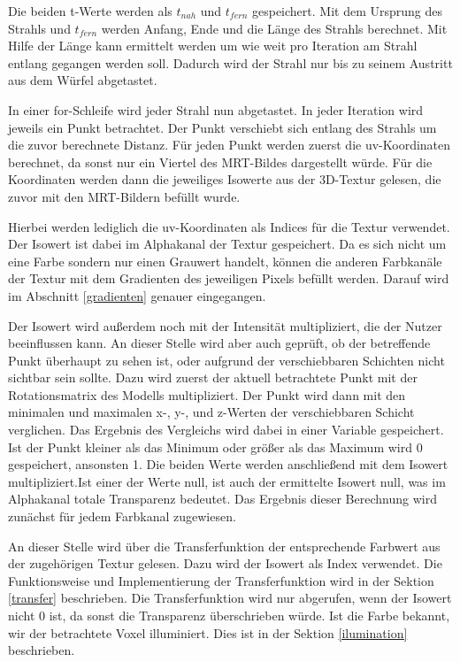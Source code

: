 Die beiden t-Werte werden als $t_{nah}$ und $t_{fern}$ gespeichert.
Mit dem Ursprung des Strahls und $t_{fern}$ werden Anfang, Ende und die Länge des Strahls berechnet. Mit Hilfe der Länge kann ermittelt werden um wie weit pro Iteration am Strahl entlang gegangen werden soll. Dadurch wird der Strahl nur bis zu seinem Austritt aus dem Würfel abgetastet. 

In einer for-Schleife wird jeder Strahl nun abgetastet. In jeder Iteration wird jeweils ein Punkt betrachtet. Der Punkt verschiebt sich entlang des Strahls um die zuvor berechnete Distanz.
Für jeden Punkt werden zuerst die uv-Koordinaten berechnet, da sonst nur ein Viertel des MRT-Bildes dargestellt würde.
Für die Koordinaten werden dann die jeweiliges Isowerte aus der 3D-Textur gelesen, die zuvor mit den MRT-Bildern befüllt wurde.

Hierbei werden lediglich die uv-Koordinaten als Indices für die Textur verwendet. 
Der Isowert ist dabei im Alphakanal der Textur gespeichert. Da es sich nicht um eine Farbe sondern nur einen Grauwert handelt, können die anderen Farbkanäle der Textur mit dem Gradienten des jeweiligen Pixels befüllt werden. Darauf wird im Abschnitt \ref{gradienten} genauer eingegangen.

Der Isowert wird außerdem noch mit der Intensität multipliziert, die der Nutzer beeinflussen kann.
An dieser Stelle wird aber auch geprüft, ob der betreffende Punkt überhaupt zu sehen ist, oder aufgrund der verschiebbaren Schichten nicht sichtbar sein sollte. 
Dazu wird zuerst der aktuell betrachtete Punkt mit der Rotationsmatrix des Modells multipliziert.
Der Punkt wird dann mit den minimalen und maximalen x-, y-, und z-Werten der verschiebbaren Schicht verglichen. Das Ergebnis des Vergleichs wird dabei in einer Variable gespeichert. Ist der Punkt kleiner als das Minimum oder größer als das Maximum wird 0 gespeichert, ansonsten 1. 
Die beiden Werte werden anschließend mit dem Isowert multipliziert.Ist einer der Werte null, ist auch der ermittelte Isowert null, was im Alphakanal totale Transparenz bedeutet. 
Das Ergebnis dieser Berechnung wird zunächst für jedem Farbkanal zugewiesen.

An dieser Stelle wird über die Transferfunktion der entsprechende Farbwert aus der zugehörigen Textur gelesen. Dazu wird der Isowert als Index verwendet. Die Funktionsweise und Implementierung der Transferfunktion wird in der Sektion \ref{transfer} beschrieben.
Die Transferfunktion wird nur abgerufen, wenn der Isowert nicht 0 ist, da sonst die Transparenz überschrieben würde.
Ist die Farbe bekannt, wir der betrachtete Voxel illuminiert. Dies ist in der Sektion \ref{ilumination} beschrieben. 

